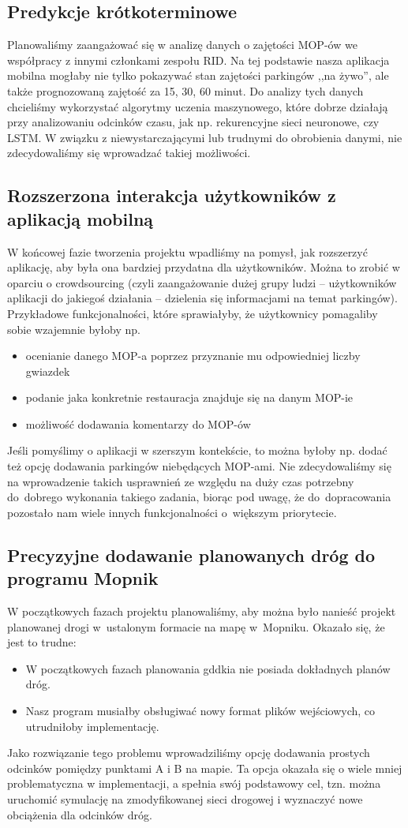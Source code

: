 \subsection{Predykcje krótkoterminowe}
Planowaliśmy zaangażować się w analizę danych o zajętości MOP-ów we współpracy z innymi członkami zespołu RID. Na tej podstawie nasza aplikacja mobilna mogłaby nie tylko pokazywać stan zajętości parkingów ,,na żywo'', ale także prognozowaną zajętość za 15, 30, 60 minut. Do analizy tych danych chcieliśmy wykorzystać algorytmy uczenia maszynowego, które dobrze działają przy analizowaniu odcinków czasu, jak np. rekurencyjne sieci neuronowe, czy LSTM. W związku z niewystarczającymi lub trudnymi do obrobienia danymi, nie zdecydowaliśmy się wprowadzać takiej możliwości.
\subsection{Rozszerzona interakcja użytkowników z aplikacją mobilną}
W końcowej fazie tworzenia projektu wpadliśmy na pomysł, jak rozszerzyć aplikację, aby była ona bardziej przydatna dla użytkowników. Można to zrobić w oparciu o crowdsourcing (czyli zaangażowanie dużej grupy ludzi -- użytkowników aplikacji do jakiegoś działania -- dzielenia się informacjami na temat parkingów). Przykładowe funkcjonalności, które sprawiałyby, że użytkownicy pomagaliby sobie wzajemnie byłoby np.
\begin{itemize}
\item ocenianie danego MOP-a poprzez przyznanie mu odpowiedniej liczby gwiazdek
\item podanie jaka konkretnie restauracja znajduje się na danym MOP-ie
\item możliwość dodawania komentarzy do MOP-ów
\end{itemize}
Jeśli pomyślimy o aplikacji w szerszym kontekście, to można byłoby np. dodać też opcję dodawania parkingów niebędących MOP-ami.
Nie zdecydowaliśmy się na wprowadzenie takich usprawnień ze względu na duży czas potrzebny do~dobrego wykonania takiego zadania, biorąc pod uwagę, że do~dopracowania pozostało nam wiele innych funkcjonalności o~większym priorytecie.
\subsection{Precyzyjne dodawanie planowanych dróg do programu Mopnik}
W początkowych fazach projektu planowaliśmy, aby można było nanieść projekt planowanej drogi w~ustalonym formacie na mapę w~Mopniku. Okazało się, że jest to trudne:
\begin{itemize}
\item W początkowych fazach planowania \acrshort{gddkia} nie posiada dokładnych planów dróg.
\item Nasz program musiałby obsługiwać nowy format plików wejściowych, co utrudniłoby implementację.
\end{itemize}
Jako rozwiązanie tego problemu wprowadziliśmy opcję dodawania prostych odcinków pomiędzy punktami A i B na mapie. Ta opcja okazała się o wiele mniej problematyczna w implementacji, a spełnia swój podstawowy cel, tzn. można uruchomić symulację na zmodyfikowanej sieci drogowej i wyznaczyć nowe obciążenia dla odcinków dróg.

